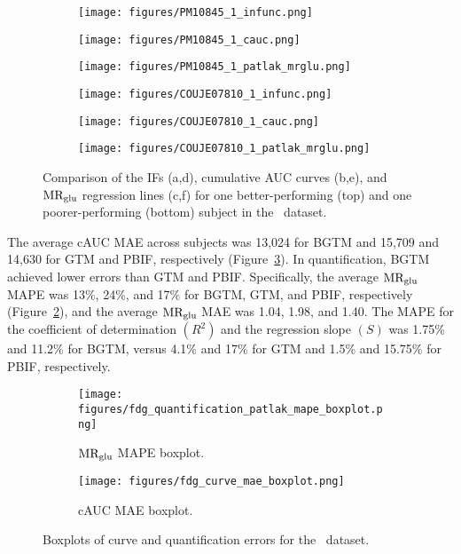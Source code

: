 \begin{figure}[h]
	\centering
	\begin{subfigure}[b]{0.322\textwidth}
		\texttt{[image: figures/PM10845\_1\_infunc.png]}
		\caption{}
	\end{subfigure}
	\begin{subfigure}[b]{0.322\textwidth}
		\texttt{[image: figures/PM10845\_1\_cauc.png]}
		\caption{}
	\end{subfigure}
	\begin{subfigure}[b]{0.322\textwidth}
		\texttt{[image: figures/PM10845\_1\_patlak\_mrglu.png]}
		\caption{}
	\end{subfigure}
	\begin{subfigure}[b]{0.322\textwidth}
		\texttt{[image: figures/COUJE07810\_1\_infunc.png]}
		\caption{}
	\end{subfigure}
	\begin{subfigure}[b]{0.322\textwidth}
		\texttt{[image: figures/COUJE07810\_1\_cauc.png]}
		\caption{}
	\end{subfigure}
	\begin{subfigure}[b]{0.322\textwidth}
		\texttt{[image: figures/COUJE07810\_1\_patlak\_mrglu.png]}
		\caption{}
	\end{subfigure}
	\caption{Comparison of the IFs (a,d), cumulative AUC curves (b,e), and \(\text{MR}_{\text{glu}}\) regression lines (c,f) for one better-performing (top) and one poorer-performing (bottom) subject in the \fdg\ dataset.}
	\label{fig:fdg_ifs}
\end{figure}

The average cAUC MAE across subjects was 13{,}024 for BGTM and 15{,}709 and 14{,}630 for GTM and PBIF, respectively (Figure~\ref{subfig:fdg_cauc_boxplot}).
In quantification, BGTM achieved lower errors than GTM and PBIF.
Specifically, the average \(\text{MR}_{\text{glu}}\) MAPE was 13\%, 24\%, and 17\% for BGTM, GTM, and PBIF, respectively (Figure~\ref{subfig:fdg_mape_boxplot}), and the average \(\text{MR}_{\text{glu}}\) MAE was 1.04, 1.98, and 1.40.
The MAPE for the coefficient of determination \((R^2)\) and the regression slope \((S)\) was 1.75\% and 11.2\% for BGTM, versus 4.1\% and 17\% for GTM and 1.5\% and 15.75\% for PBIF, respectively.

\begin{figure}[h]
	\centering
	\begin{subfigure}[b]{0.45\textwidth}
		\texttt{[image: figures/fdg\_quantification\_patlak\_mape\_boxplot.png]}
		\caption{\(\text{MR}_{\text{glu}}\) MAPE boxplot.}
		\label{subfig:fdg_mape_boxplot}
	\end{subfigure}
	\begin{subfigure}[b]{0.45\textwidth}
		\texttt{[image: figures/fdg\_curve\_mae\_boxplot.png]}
		\caption{cAUC MAE boxplot.}
		\label{subfig:fdg_cauc_boxplot}
	\end{subfigure}
	\caption{Boxplots of curve and quantification errors for the \fdg\ dataset.}
	\label{fig:fdg_boxplots}
\end{figure}

